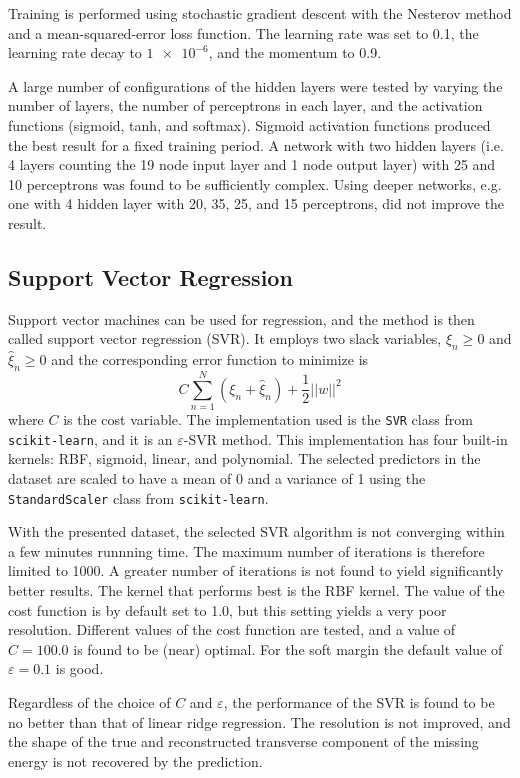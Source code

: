 \documentclass{scrartcl}
\begin{document}
Training is performed using stochastic gradient descent with the Nesterov method \cite{nesterov} and a mean-squared-error loss function. The learning rate was set to 0.1, the learning rate decay to $\num{1e-6}$, and the momentum to 0.9.

A large number of configurations of the hidden layers were tested by varying the number of layers, the number of perceptrons in each layer, and the activation functions (sigmoid, tanh, and softmax). Sigmoid activation functions produced the best result for a fixed training period. A network with two hidden layers (i.e. 4 layers counting the 19 node input layer and 1 node output layer) with 25 and 10 perceptrons was found to be sufficiently complex. Using deeper networks, e.g. one with 4 hidden layer with 20, 35, 25, and 15 perceptrons, did not improve the result.

\subsection{Support Vector Regression}

Support vector machines can be used for regression, and the method is then called support vector regression (SVR). It employs two slack variables, $ξ_n ≥ 0$ and $\hat{ξ}_n ≥ 0$ and the corresponding error function to minimize is
\[
  C \sum_{n=1}^N(ξ_n + \hat{ξ}_n) + \frac{1}{2}||w||^2
\]
where $C$ is the cost variable. The implementation used is the \texttt{SVR} class from \texttt{scikit-learn}, and it is an $ε$-SVR method. This implementation has four built-in kernels: RBF, sigmoid, linear, and polynomial. The selected predictors in the dataset are scaled to have a mean of 0 and a variance of 1 using the \texttt{StandardScaler} class from \texttt{scikit-learn}.

With the presented dataset, the selected SVR algorithm is not converging within a few minutes runnning time. The maximum number of iterations is therefore limited to 1000. A greater number of iterations is not found to yield significantly better results. The kernel that performs best is the RBF kernel. The value of the cost function is by default set to 1.0, but this setting yields a very poor resolution. Different values of the cost function are tested, and a value of $C=100.0$ is found to be (near) optimal. For the soft margin the default value of $ε=0.1$ is good.

Regardless of the choice of $C$ and $ε$, the performance of the SVR is found to be no better than that of linear ridge regression. The resolution is not improved, and the shape of the true and reconstructed transverse component of the missing energy is not recovered by the prediction.
\end{document}

